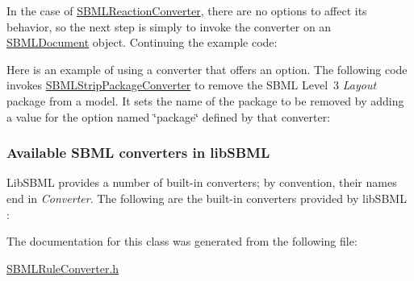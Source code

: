 In the case of \hyperlink{class_s_b_m_l_reaction_converter}{S\+B\+M\+L\+Reaction\+Converter}, there are no options to affect its behavior, so the next step is simply to invoke the converter on an \hyperlink{class_s_b_m_l_document}{S\+B\+M\+L\+Document} object. Continuing the example code\+:

Here is an example of using a converter that offers an option. The following code invokes \hyperlink{class_s_b_m_l_strip_package_converter}{S\+B\+M\+L\+Strip\+Package\+Converter} to remove the S\+B\+ML Level~3 {\itshape Layout} package from a model. It sets the name of the package to be removed by adding a value for the option named {\ttfamily \char`\"{}package\char`\"{}} defined by that converter\+:\hypertarget{classdoc__section__using__sbml__converters_available-converters}{}\subsubsection{Available S\+B\+M\+L converters in lib\+S\+B\+ML}\label{classdoc__section__using__sbml__converters_available-converters}
Lib\+S\+B\+ML provides a number of built-\/in converters; by convention, their names end in {\itshape Converter}. The following are the built-\/in converters provided by lib\+S\+B\+ML \+:

The documentation for this class was generated from the following file\+:\begin{DoxyCompactItemize}
\item 
\hyperlink{_s_b_m_l_rule_converter_8h}{S\+B\+M\+L\+Rule\+Converter.\+h}\end{DoxyCompactItemize}
